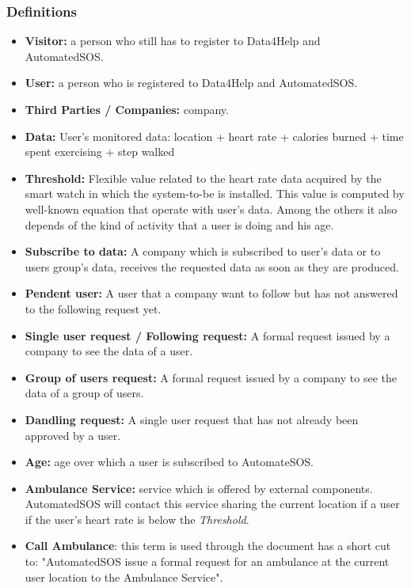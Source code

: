 \documentclass{article}
\begin{document}
\subsubsection{Definitions}
\begin{itemize}
	\item\textbf{Visitor:} a person who still has to register to Data4Help and\\ AutomatedSOS.
	\item\textbf{User:} a person who is registered to Data4Help and AutomatedSOS.
	\item\textbf{Third Parties / Companies:} company.
	\item\textbf{Data:} User's monitored data: location + heart rate + calories burned + time spent exercising + step walked 
	\item \textbf{Threshold:} Flexible value related to the heart rate data acquired by the smart watch in which the system-to-be is installed. This value is computed by well-known equation that operate with user's data. Among the others it also depends of the kind of activity that a user is doing and his age.  
	\item \textbf{Subscribe to data:} A company which is subscribed to user's data or to users group's data, receives the requested data as soon as they are produced.  
	\item \textbf{Pendent user:} A user that a company want to follow but has not answered to the following request yet.
	\item \textbf{Single user request / Following request:} A formal request issued by a company to see the data of a user.
	\item \textbf{Group of users request:} A formal request issued by a company to see the data of a group of users.
	\item \textbf{Dandling request:} A single user request that has not already been approved by a user.
	\item \textbf{Age:} age over which a user is subscribed to AutomateSOS. 
	\item \textbf{Ambulance Service:} service which is offered by external components. AutomatedSOS will contact this service sharing the current location if a user if the user's heart rate is below the \emph{Threshold}.
	\item \textbf{Call Ambulance}: this term is used through the document has a short cut to: "AutomatedSOS issue a formal request for an ambulance at the current user location to the Ambulance Service".
\end{itemize}
\end{document}
